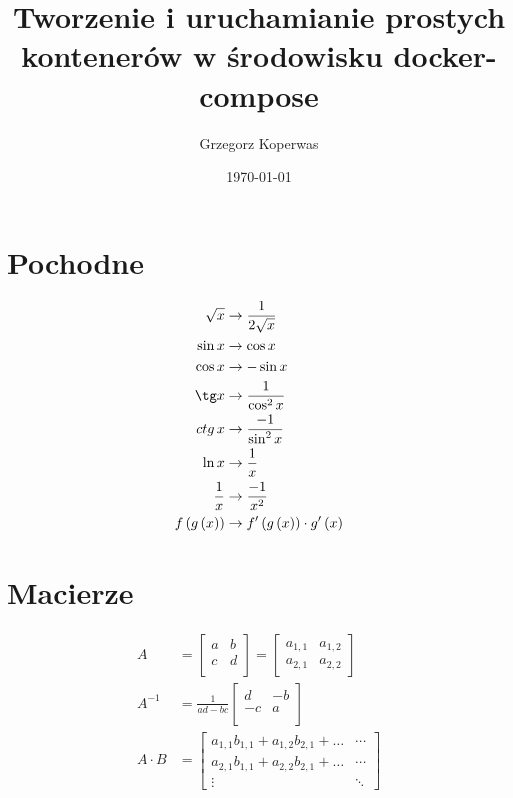 \documentclass[a5paper,10pt]{article}
\title{Tworzenie i uruchamianie prostych kontenerów w środowisku  docker-compose}
\author{Grzegorz Koperwas}
\date{\today}
\begin{document}
\begin{multicols}{2}
    \section{Pochodne}
    \begin{align*}
        \sqrt{x} &\rightarrow \frac{1}{2 \sqrt{x}}\\
        \sin x &\rightarrow \cos x\\
        \cos x &\rightarrow - \sin x\\
        \tg x &\rightarrow \frac{1}{\cos^2 x}\\
        ctg\, x &\rightarrow \frac{ -1}{\sin^2 x}\\
        \ln x &\rightarrow \frac{1}{x}\\
        \frac{1}{x} &\rightarrow \frac{ - 1}{x^2}\\
        f \left(g \left(x\right)\right) &\rightarrow f'\left(g\left(x\right)\right) \cdot g'\left(x\right)
    \end{align*}

    \section{Macierze}
    \begin{align*}
        A &= \left[\begin{matrix}
            a   & b     \\
            c   & d     \\
        \end{matrix}\right] = 
        \left[ \begin{matrix}
            a_{1,1} & a_{1,2} \\
            a_{2,1} & a_{2,2}
        \end{matrix} \right]\\
        A^{-1} &= \frac{1}{ad - bc}\left[\begin{matrix}
            d   & -b    \\
            -c  & a     \\
        \end{matrix}\right]\\
        A \cdot B &= \left[\begin{matrix}
            a_{1,1} b_{1,1} + a_{1,2} b_{2,1} + \dots & \cdots \\
            a_{2,1} b_{1,1} + a_{2,2} b_{2,1} + \dots & \cdots \\
            \vdots & \ddots
        \end{matrix}\right]
    \end{align*}
    


\end{multicols}
\end{document}
